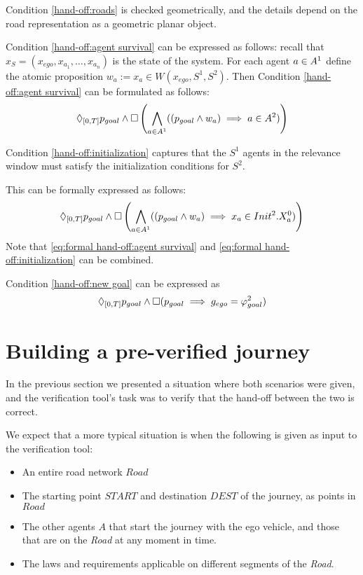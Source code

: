 Condition \ref{hand-off:roads} is checked geometrically, and the details depend on the road representation as a geometric planar object.

Condition \ref{hand-off:agent survival} can be expressed as follows:
recall that $x_S = (x_{ego},x_{a_1},\ldots,x_{a_n})$ is the state of the system. 
For each agent $a \in A^1$ define the atomic proposition $w_{a} := x_{a} \in W(x_{ego},S^1,S^2)$.
Then Condition \ref{hand-off:agent survival} can be formulated as follows: 
\begin{equation}
\label{eq:formal hand-off:agent survival}
\Diamond_{[0,T]} p_{goal} \wedge \square \left(\bigwedge_{a\in A^1} ((p_{goal} \wedge  w_a) \implies a \in A^2 )\right)
\end{equation}

Condition \ref{hand-off:initialization} captures that the $S^1$ agents in the relevance window must satisfy the initialization conditions for $S^2$.

This can be formally expressed as follows:
\begin{equation}
\label{eq:formal hand-off:initialization}
\Diamond_{[0,T]} p_{goal} \wedge \square \left(\bigwedge_{a\in A^1} ((p_{goal} \wedge  w_a) \implies x_a \in Init^2.X_a^0 )\right)
\end{equation}
Note that \eqref{eq:formal hand-off:agent survival} and \eqref{eq:formal hand-off:initialization} can be combined.

Condition \ref{hand-off:new goal} can be expressed as
\begin{equation}
\Diamond_{[0,T]} p_{goal} \wedge \square(p_{goal} \implies g_{ego} = \varphi_{goal}^2)
\end{equation}

\section{Building a pre-verified journey}
\label{sec:detecting hand-off}
In the previous section we presented a situation where both scenarios were given, and the verification tool's task was to verify that the hand-off between the two is correct.

We expect that a more typical situation is when the following is given as input to the verification tool:
\begin{itemize}
	\item An entire road network $Road$
	\item The starting point $START$ and destination $DEST$ of the journey, as points in $Road$
	\item The other agents $A$ that start the journey with the ego vehicle, and those that are on the \emph{Road} at any moment in time.
	\item The laws and requirements applicable on different segments of the \emph{Road}.
\end{itemize}

